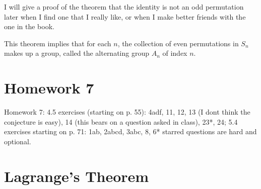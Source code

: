 \documentclass[12pt]{article}
\begin{document}
I will give a proof of the theorem that the identity is not an odd permutation later when I find one that I really like, or when I make better friends with the one in the book.

This theorem implies that for each $n$, the collection of even permutations in $S_n$ makes up a group, called the alternating group $A_n$ of index $n$.



\section{Homework 7}

Homework 7: 4.5 exercises (starting on p. 55): 4adf, 11, 12, 13 (I dont think the conjecture is easy), 14 (this bears on a question asked in class), 23*, 24; 5.4 exercises starting on p. 71: 1ab, 2abcd, 3abc, 8, 6* starred questions are hard and optional. 

\section{Lagrange's Theorem}
\end{document}
